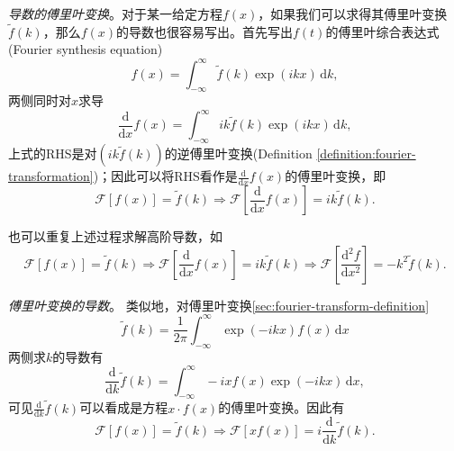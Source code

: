 \textit{导数的傅里叶变换}。对于某一给定方程$f(x)$，如果我们可以求得其傅里叶变换$\tilde{f}(k)$，那么$f(x)$的导数也很容易写出。首先写出$f(t)$的傅里叶综合表达式(Fourier synthesis equation)
\begin{equation*}
  f(x) = \int_{-\infty}^{\infty} \tilde{f}(k) \exp \left( i k x \right) \, \mathrm{d} k,
\end{equation*}
两侧同时对$x$求导
\begin{equation*}
  \frac{\mathrm{d}}{\mathrm{d} x}f(x)
  = \int_{-\infty}^{\infty} i k \tilde{f}(k) \exp \left( i k x \right) \, \mathrm{d} k,
\end{equation*}
上式的RHS是对$\left( i k \widetilde{f} (k) \right)$的逆傅里叶变换(Definition \ref{definition:fourier-transformation})；因此可以将RHS看作是$\frac{\mathrm{d}}{\mathrm{d} x}f(x)$的傅里叶变换，即
\begin{equation}
  \label{eq:fourier-derivative-ft-eq}
  \mathcal{F}\left[ f(x) \right]
  = \tilde{f}(k) \Rightarrow \mathcal{F}
  \left[
  \frac{\mathrm{d}}{\mathrm{d} x}f \left( x \right)
  \right] = i k \tilde{f}(k).
\end{equation}

也可以重复上述过程求解高阶导数，如
\begin{equation}
  \label{eq:fourier-derivative-ft-eq-higher}
  \mathcal{F} \left[ f(x) \right] = \tilde{f}(k)
  \Rightarrow
  \mathcal{F} \left[ \frac{\mathrm{d}}{\mathrm{d} x} f(x) \right]
  = i k \tilde{f} (k)
  \Rightarrow
  \mathcal{F}
  \left[
  \frac{\mathrm{d}^{2}f}{\mathrm{d} x^2} \right]
  = - k^{2} \tilde{f}(k).
\end{equation}

\textit{傅里叶变换的导数}。
类似地，对傅里叶变换\eqref{sec:fourier-transform-definition}
\begin{equation*}
  \tilde{f} \left( k \right) =
  \frac{1}{2 \pi} \int_{-\infty}^{\infty}
  \exp \left( - i k x \right) f(x) \, \mathrm{d} x
\end{equation*}
两侧求$k$的导数有
\begin{equation*}
  \frac{\mathrm{d}}{\mathrm{d} k} \tilde{f}(k)
  = \int_{-\infty}^{\infty} - i x f(x) \exp \left( - i k x \right) \, \mathrm{d} x,
\end{equation*}
可见$\frac{\mathrm{d}}{\mathrm{d} k} \tilde{f}(k)$可以看成是方程$x \cdot f(x)$的傅里叶变换。因此有
\begin{equation}
  \label{eq:fourier-ft-derivative-eq}
  \mathcal{F}\left[ f(x) \right] = \tilde{f}(k)
  \Rightarrow \mathcal{F} \left[ x f(x) \right]
  = i \frac{\mathrm{d}}{\mathrm{d} k }\tilde{f}(k).
\end{equation}

